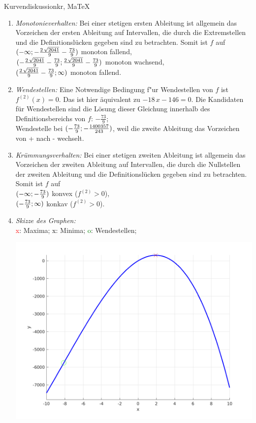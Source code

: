 \begin{MAufgabe}{Kurvendiskussion}{kr, MaTeX}
\begin{enumerate}
 \item \emph{Monotonieverhalten:} 
 Bei einer stetigen ersten Ableitung ist allgemein das Vorzeichen der ersten Ableitung auf Intervallen, die durch die Extremstellen und die Definitionsl\"ucken gegeben sind zu betrachten. Somit ist $f$ auf \\ 
 $(-\infty; - \frac{2\, \sqrt{2041}}{9} - \frac{73}{9})$ monoton fallend, \\ 
 $( - \frac{2\, \sqrt{2041}}{9} - \frac{73}{9};\frac{2\, \sqrt{2041}}{9} - \frac{73}{9})$ monoton  wachsend, \\ 
 $(\frac{2\, \sqrt{2041}}{9} - \frac{73}{9}; \infty)$ monoton fallend. \\ 
 \item \emph{Wendestellen:} 
 Eine Notwendige Bedingung f"ur Wendestellen von $f$ ist $f^{(2)}(x)=0$. 
 Das ist hier \"aquivalent zu $ - 18\, x - 146=0$. 
 Die Kandidaten f\"ur Wendestellen sind die L\"osung dieser Gleichung innerhalb des Definitionsbereichs von $f$: $- \frac{73}{9}$; \\ 
 Wendestelle bei $(- \frac{73}{9};- \frac{1400357}{243})$, weil die zweite Ableitung das Vorzeichen von + nach - wechselt. \\ 
 \item \emph{Kr\"ummungsverhalten:} 
 Bei einer stetigen zweiten Ableitung ist allgemein das Vorzeichen der zweiten Ableitung auf Intervallen, die durch die Nullstellen der zweiten Ableitung und die Definitionsl\"ucken gegeben sind zu betrachten. 
 Somit ist $f$ auf \\ 
 $(-\infty ;- \frac{73}{9})$  konvex ($f^{(2)}>0$), \\ 
 $(- \frac{73}{9}; \infty)$  konkav ($f^{(2)}>0$). \\ 
 \item \emph{Skizze des Graphen:} \\ 
 {\textcolor{red} x}: Maxima; {\textcolor{black} x}: Minima; {\textcolor{green} o}: Wendestellen; 
  \begin{center}
  \includegraphics[width=0.8\linewidth]{Abb_zur_Ag_autogenerated_fractions_20.png} \end{center}
  
 \end{enumerate}
 \else\relax\fi
  \end{MAufgabe}